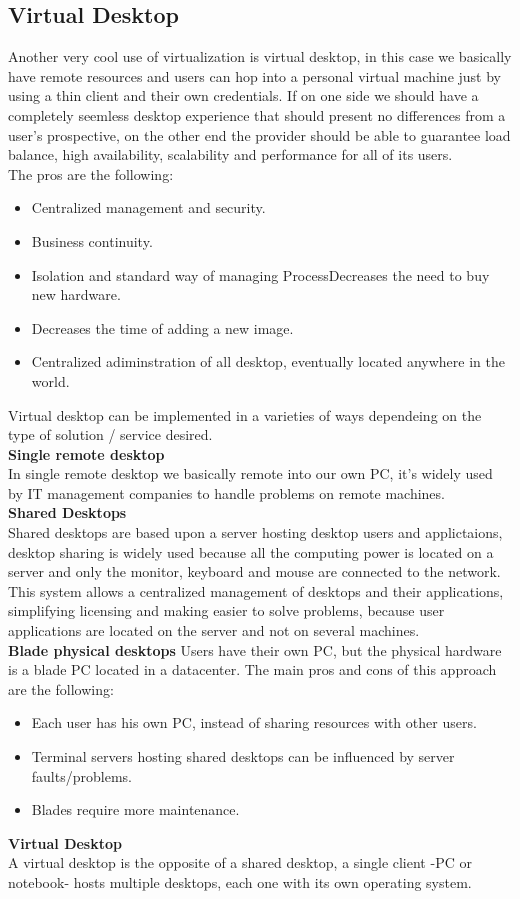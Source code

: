 \subsection{Virtual Desktop}
Another very cool use of virtualization is virtual desktop, in this case we basically have remote resources and users can hop into a personal virtual machine just by using a thin client and their own credentials. If on one side we should have a completely seemless desktop experience that should present no differences from a user's prospective, on the other end the provider should be able to guarantee load balance, high availability, scalability and performance for all of its users. \\
The pros are the following:
\begin{itemize}
    \item Centralized management and security.
    \item Business continuity.
    \item Isolation and standard way of managing ProcessDecreases the need to buy new hardware.
    \item Decreases the time of adding a new image.
    \item Centralized adiminstration of all desktop, eventually located anywhere in the world.
\end{itemize}
Virtual desktop can be implemented in a varieties of ways dependeing on the type of solution / service desired. \\
\textbf{Single remote desktop} \\
In single remote desktop we basically remote into our own PC, it's widely used by IT management companies to handle problems on remote machines. \\
\miniSpace
\textbf{Shared Desktops} \\
Shared desktops are based upon a server hosting desktop users and applictaions, desktop sharing is widely used because all the computing power is located on a server and only the monitor, keyboard and mouse are connected to the network. \\
This system allows a centralized management of desktops and their applications, simplifying licensing and making easier to solve problems, because user applications are located on the server and not on several machines. \\
\miniSpace
\textbf{Blade physical desktops}
Users have their own PC, but the physical hardware is a blade PC located in a datacenter. The main pros and cons of this approach are the following:
\begin{itemize}
    \item Each user has his own PC, instead of sharing resources with other users.
    \item Terminal servers hosting shared desktops can be influenced by server faults/problems.
    \item Blades require more maintenance.
\end{itemize}
\textbf{Virtual Desktop} \\
A virtual desktop is the opposite of a shared desktop, a single client -PC or notebook- hosts multiple desktops, each one with its own operating system.
